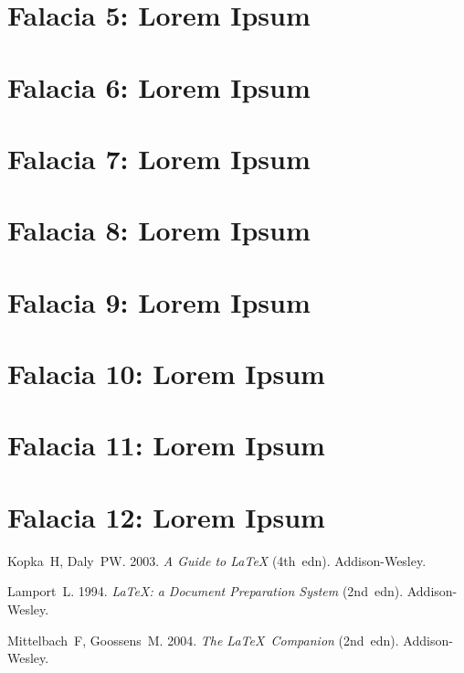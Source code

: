 \documentclass[times]{simauth}
\begin{document}
\section{Falacia 5: Lorem Ipsum}

\section{Falacia 6: Lorem Ipsum}

\section{Falacia 7: Lorem Ipsum}

\section{Falacia 8: Lorem Ipsum}

\section{Falacia 9: Lorem Ipsum}

\section{Falacia 10: Lorem Ipsum}

\section{Falacia 11: Lorem Ipsum}

\section{Falacia 12: Lorem Ipsum}


\begin{thebibliography}{9}

 Kopka~H, Daly~PW. 2003. \emph{A Guide to \LaTeX} (4th~edn).
Addison-Wesley.

 Lamport~L. 1994. \emph{\LaTeX: a Document Preparation System} (2nd~edn).
Addison-Wesley.

 Mittelbach~F, Goossens~M. 2004. \emph{The \LaTeX\ Companion}
(2nd~edn). Addison-Wesley.
\end{thebibliography}
\end{document}
